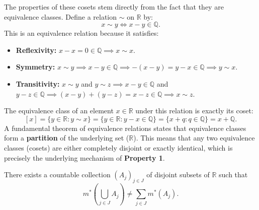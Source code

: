 \begin{remark}
    The properties of these cosets stem directly from the fact that they are equivalence classes. 
    Define a relation $\sim$ on $\mathbb{R}$ by:
    $$ x \sim y \iff x-y \in \mathbb{Q}. $$
    This is an equivalence relation because it satisfies:
    \begin{itemize}
        \item \textbf{Reflexivity:} $x-x = 0 \in \mathbb{Q} \implies x \sim x$.
        \item \textbf{Symmetry:} $x \sim y \implies x-y \in \mathbb{Q} \implies -(x-y) = y-x \in \mathbb{Q} \implies y \sim x$.
        \item \textbf{Transitivity:} $x \sim y$ and $y \sim z \implies x-y \in \mathbb{Q}$ and $y-z \in \mathbb{Q} \implies (x-y)+(y-z) = x-z \in \mathbb{Q} \implies x \sim z$.
    \end{itemize}
    The equivalence class of an element $x \in \mathbb{R}$ under this relation is exactly its coset:
    $$ [x] = \{y \in \mathbb{R} : y \sim x\} = \{y \in \mathbb{R} : y-x \in \mathbb{Q}\} = \{x+q : q \in \mathbb{Q}\} = x+\mathbb{Q}. $$
    A fundamental theorem of equivalence relations states that equivalence classes form a \textbf{partition} of the underlying set ($\mathbb{R}$). This means that any two equivalence classes (cosets) are either completely disjoint or exactly identical, which is precisely the underlying mechanism of \textbf{Property 1}.
\end{remark}



\begin{proposition}
    There exists a countable collection $(A_j)_{j \in J}$ of disjoint subsets of $\mathbb{R}$ such that
    \[ m^*\left(\bigcup_{j \in J}A_j\right) \neq \sum_{j \in J}m^*(A_j). \]
\end{proposition}

